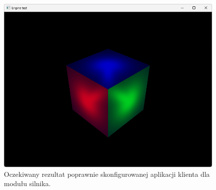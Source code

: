 \begin{figure}[h!]
	\centering
	\includegraphics[width=\textwidth]{images/appendix_engine_demo.png}
	\caption{Oczekiwany rezultat poprawnie skonfigurowanej aplikacji klienta dla modułu silnika.}
	\label{appendix_engine_demo}
\end{figure}

\vfill
\clearpage

